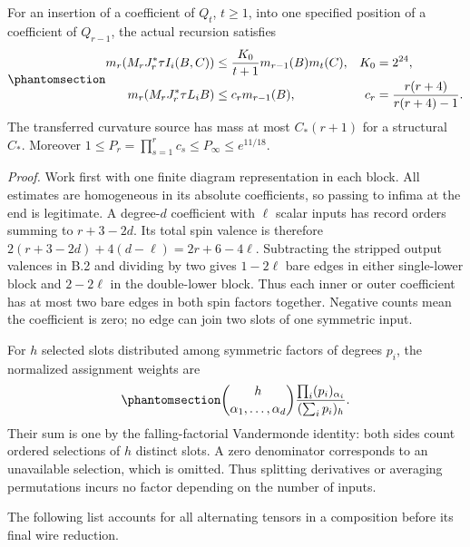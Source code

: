\documentclass[
  english,
  11pt,
  reqno]{amsart}
\begin{document}
For an insertion of a coefficient of \(Q_t\), \(t\ge1\), into one
specified position of a coefficient of \(Q_{r-1}\), the actual recursion
satisfies
\begin{equation}\protect\phantomsection\label{eq:gg-budget-transfer-bounds}{
 \begin{aligned}
 m_r(M_rJ_r^*\tau I_i(B,C))
       &\le\frac{K_0}{t+1}m_{r-1}(B)m_t(C),&K_0&=2^{24},\\
 m_r(M_rJ_r^*\tau L_iB)
       &\le c_rm_{r-1}(B),&
 c_r&=\frac{r(r+4)}{r(r+4)-1}.
 \end{aligned}
}\end{equation} The transferred curvature source has mass at most
\(C_*(r+1)\) for a structural \(C_*\). Moreover
\(1\le P_r=\prod_{s=1}^rc_s\le P_\infty\le e^{11/18}\).

\emph{Proof.} Work first with one finite diagram representation in each
block. All estimates are homogeneous in its absolute coefficients, so
passing to infima at the end is legitimate. A degree-\(d\) coefficient
with \(\ell\) scalar inputs has record orders summing to \(r+3-2d\). Its
total spin valence is therefore \(2(r+3-2d)+4(d-\ell)=2r+6-4\ell\).
Subtracting the stripped output valences in B.2 and dividing by two
gives \(1-2\ell\) bare edges in either single-lower block and
\(2-2\ell\) in the double-lower block. Thus each inner or outer
coefficient has at most two bare edges in both spin factors together.
Negative counts mean the coefficient is zero; no edge can join two slots
of one symmetric input.

For \(h\) selected slots distributed among symmetric factors of degrees
\(p_i\), the normalized assignment weights are
\begin{equation}\protect\phantomsection\label{eq:gg-budget-assignment-weights}{
 \binom h{\alpha_1,\ldots,\alpha_d}
                  \frac{\prod_i(p_i)_{\alpha_i}}{(\sum_i p_i)_h}.
}\end{equation} Their sum is one by the falling-factorial Vandermonde
identity: both sides count ordered selections of \(h\) distinct slots. A
zero denominator corresponds to an unavailable selection, which is
omitted. Thus splitting derivatives or averaging permutations incurs no
factor depending on the number of inputs.

The following list accounts for all alternating tensors in a composition
before its final wire reduction.
\end{document}
